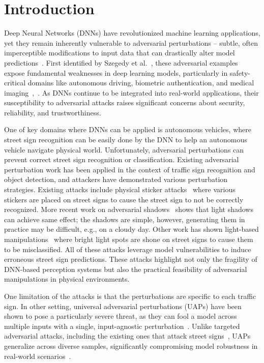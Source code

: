 \section{Introduction}
\label{sec_introduction}

Deep Neural Networks (DNNs) have revolutionized machine learning applications, yet they remain inherently vulnerable to adversarial perturbations -- subtle, often imperceptible modifications to input data that can drastically alter model predictions~\cite{chakraborty2018adversarial}. First identified by Szegedy et al.~\cite{szegedy2013intriguing}, these adversarial examples expose fundamental weaknesses in deep learning models, particularly in safety-critical domains like autonomous driving, biometric authentication, and medical imaging~\cite{goodfellow2014explaining},~\cite{kumar2024medical}. As DNNs continue to be integrated into real-world applications, their susceptibility to adversarial attacks raises significant concerns about security, reliability, and trustworthiness.

One of key domains where DNNs can be applied is autonomous vehicles, where street sign recognition can be easily done by the DNN to help an autonomous vehicle navigate physical world. Unfortunately, adversarial perturbations can prevent correct street sign recognition or classification. Existing adversarial perturbation work has been applied in the context of traffic sign recognition and object detection, and attackers have demonstrated various perturbation strategies. Existing attacks include physical sticker attacks~\cite{eykholt2018robust} where various stickers are placed on street signs to cause the street sign to not be correctly recognized. More recent work on adversarial shadows~\cite{zhong2022shadows} shows that light shadows can achieve same effect; the shadows are simple, however, generating them in practice may be difficult, e.g., on a cloudy day. Other work has shown light-based manipulations~\cite{hsiao2024natural} where bright light spots are shone on street signs to cause them to be misclassified. All of these  attacks leverage model vulnerabilities to induce erroneous street sign predictions. These attacks highlight not only the fragility of DNN-based perception systems but also the practical feasibility of adversarial manipulations in physical environments.

One limitation of the attacks is that the perturbations are specific to each traffic sign. In other setting, universal adversarial perturbations (UAPs) have been shown to pose a particularly severe threat, as they can fool a model across multiple inputs with a single, input-agnostic perturbation~\cite{moosavi2017universal}. Unlike targeted adversarial attacks, including the existing ones that attack street signs~\cite{eykholt2018robust,zhong2022shadows,hsiao2024natural},  UAPs generalize across diverse samples, significantly compromising model robustness in real-world scenarios~\cite{weng2024comparative}. 

